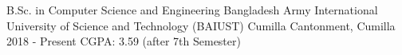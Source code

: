 

\begin{cventries}

  \cventry
    {B.Sc. in Computer Science and Engineering }%
    {Bangladesh Army International University of Science and Technology (BAIUST)} %
    {Cumilla Cantonment, Cumilla} %
    {2018 - Present} %
    {CGPA: 3.59 (after 7th Semester)} %
    {
    }
\vspace{-0.5cm}
\end{cventries}
